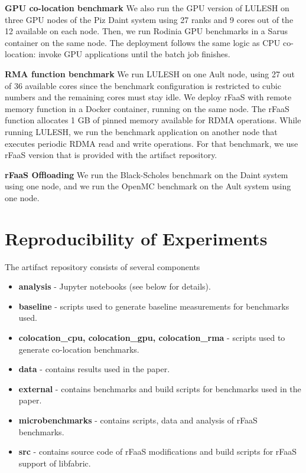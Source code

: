\documentclass{article}
\begin{document}
\textbf{GPU co-location benchmark} We also run the GPU version of LULESH on three GPU nodes of the Piz Daint system using 27 ranks and 9 cores out of the 12 available on each node. Then, we run Rodinia GPU benchmarks in a Sarus container on the same node. The deployment follows the same logic as CPU co-location: invoke GPU applications until the batch job finishes.

\textbf{RMA function benchmark} We run LULESH on one Ault node, using 27 out of 36 available cores since the benchmark configuration is restricted to cubic numbers and the remaining cores must stay idle. We deploy rFaaS with remote memory function in a Docker container, running on the same node. The rFaaS function allocates 1 GB of pinned memory available for RDMA operations. While running LULESH, we run the benchmark application on another node that executes periodic RDMA read and write operations.
For that benchmark, we use rFaaS version that is provided with the artifact repository.

\textbf{rFaaS Offloading} We run the Black-Scholes benchmark on the Daint system using one node,
and we run the OpenMC benchmark on the Ault system using one node.

\section{Reproducibility of Experiments}

The artifact repository consists of several components
\begin{itemize}
  \item \textbf{analysis} - Jupyter notebooks (see below for details).
  \item \textbf{baseline} - scripts used to generate baseline measurements for benchmarks used.
  \item \textbf{colocation\_cpu, colocation\_gpu, colocation\_rma} - scripts used to generate co-location benchmarks.
  \item \textbf{data} - contains results used in the paper.
  \item \textbf{external} - contains benchmarks and build scripts for benchmarks used in the paper.
  \item \textbf{microbenchmarks} - contains scripts, data and analysis of rFaaS benchmarks.
  \item \textbf{src} - contains source code of rFaaS modifications and build scripts for rFaaS support of libfabric.
\end{itemize}
\end{document}

